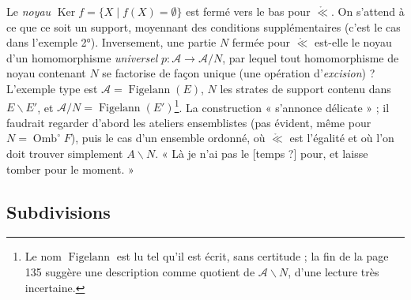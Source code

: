 \documentclass[11pt,a4paper]{article}
\begin{document}
Le \emph{noyau} $\operatorname{Ker}f = \{X \mid f(X) = \emptyset\}$ est fermé vers
le bas pour $\mathrel{\mathring{\ll}}$. On s'attend à ce que ce soit un support,
moyennant des conditions supplémentaires (c'est le cas dans l'exemple 2°).
Inversement, une partie $N$ fermée pour $\mathrel{\mathring{\ll}}$ est-elle le
noyau d'un homomorphisme \emph{universel} $p : \mathcal{A} \to \mathcal{A}/N$, par
lequel tout homomorphisme de noyau contenant $N$ se factorise de façon unique
(une opération d'\emph{excision}) ? L'exemple type est $\mathcal{A} =
\operatorname{Figelann}(E)$, $N$ les strates de support contenu dans $E
\smallsetminus E'$, et $\mathcal{A}/N = \operatorname{Figelann}(E')$\footnote{Le
nom $\operatorname{Figelann}$ est lu tel qu'il est écrit, sans certitude ; la fin
de la page 135 suggère une description comme quotient de $\mathcal{A} \smallsetminus
N$, d'une lecture très incertaine.}. La construction « s'annonce délicate » ; il
faudrait regarder d'abord les ateliers ensemblistes (pas évident, même pour $N
= \operatorname{Omb}^{\circ}F$), puis le cas d'un ensemble ordonné, où
$\mathrel{\mathring{\ll}}$ est l'égalité et où l'on doit trouver simplement $A
\smallsetminus N$. « Là je n'ai pas le [temps ?] pour, et laisse tomber pour le
moment. »

\subsection*{Subdivisions}
\end{document}
